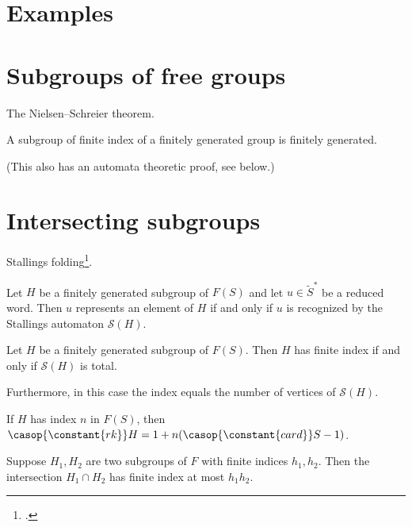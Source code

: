 \section{Examples}
\label{sec:fg-examples}

\section{Subgroups of free groups}
\label{sec:subgroups-free}

The Nielsen--Schreier theorem.


\begin{corollary}
  A subgroup of finite index of a finitely generated group is finitely generated.
\end{corollary}
(This also has an automata theoretic proof, see below.)

\section{Intersecting subgroups}
\label{sec:intersecting-subgroups}

Stallings folding\footcite{Stallings1991}.

\begin{theorem}
  Let $H$ be a finitely generated subgroup of $F(S)$ and let $u\in\tilde S^*$
  be a reduced word. Then $u$ represents an element of $H$ if and only if
  $u$ is recognized by the Stallings automaton $\mathcal{S}(H)$.
\end{theorem}
\begin{theorem}
  Let $H$ be a finitely generated subgroup of $F(S)$.
  Then $H$ has finite index if and only if $\mathcal{S}(H)$ is total.

  Furthermore, in this case the index equals the number of vertices of
  $\mathcal{S}(H)$.
\end{theorem}
\begin{corollary}
  If $H$ has index $n$ in $F(S)$, then $\casop{\constant{rk}} H = 1 + n(\casop{\constant{card}} S-1)$.
\end{corollary}

\begin{theorem}\label{thm:howson-neumann}
  Suppose $H_1,H_2$ are two subgroups of $F$ with finite indices $h_1,h_2$.
  Then the intersection $H_1\cap H_2$ has finite index at most $h_1h_2$.
\end{theorem}

